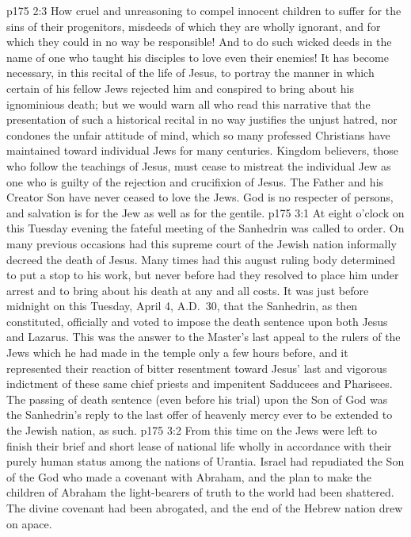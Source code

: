 \vs p175 2:3 How cruel and unreasoning to compel innocent children to suffer for the sins of their progenitors, misdeeds of which they are wholly ignorant, and for which they could in no way be responsible! And to do such wicked deeds in the name of one who taught his disciples to love even their enemies! It has become necessary, in this recital of the life of Jesus, to portray the manner in which certain of his fellow Jews rejected him and conspired to bring about his ignominious death; but we would warn all who read this narrative that the presentation of such a historical recital in no way justifies the unjust hatred, nor condones the unfair attitude of mind, which so many professed Christians have maintained toward individual Jews for many centuries. Kingdom believers, those who follow the teachings of Jesus, must cease to mistreat the individual Jew as one who is guilty of the rejection and crucifixion of Jesus. The Father and his Creator Son have never ceased to love the Jews. God is no respecter of persons, and salvation is for the Jew as well as for the gentile.
\vs p175 3:1 At eight o’clock on this Tuesday evening the fateful meeting of the Sanhedrin was called to order. On many previous occasions had this supreme court of the Jewish nation informally decreed the death of Jesus. Many times had this august ruling body determined to put a stop to his work, but never before had they resolved to place him under arrest and to bring about his death at any and all costs. It was just before midnight on this Tuesday, April 4, A.D.~30, that the Sanhedrin, as then constituted, officially and  voted to impose the death sentence upon both Jesus and Lazarus. This was the answer to the Master’s last appeal to the rulers of the Jews which he had made in the temple only a few hours before, and it represented their reaction of bitter resentment toward Jesus’ last and vigorous indictment of these same chief priests and impenitent Sadducees and Pharisees. The passing of death sentence (even before his trial) upon the Son of God was the Sanhedrin’s reply to the last offer of heavenly mercy ever to be extended to the Jewish nation, as such.\plusone
\vs p175 3:2 From this time on the Jews were left to finish their brief and short lease of national life wholly in accordance with their purely human status among the nations of Urantia. Israel had repudiated the Son of the God who made a covenant with Abraham, and the plan to make the children of Abraham the light\hyp{}bearers of truth to the world had been shattered. The divine covenant had been abrogated, and the end of the Hebrew nation drew on apace.
